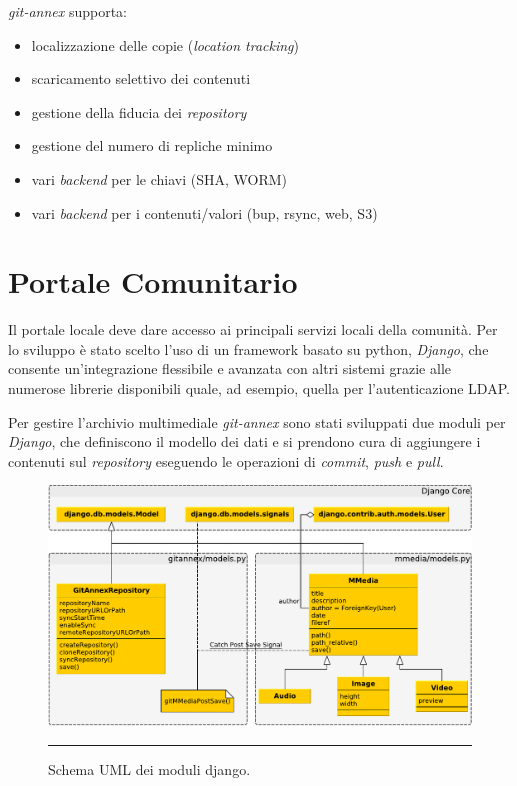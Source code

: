 \emph{git-annex} supporta:
\begin{itemize}
\item localizzazione delle copie (\emph{location tracking})
\item scaricamento selettivo dei contenuti
\item gestione della fiducia dei \emph{repository}
\item gestione del numero di repliche minimo 
\item vari \emph{backend} per le chiavi (SHA, WORM)
\item vari \emph{backend} per i contenuti/valori (bup, rsync, web, S3)
\end{itemize}

\section{Portale Comunitario}

Il portale locale deve dare accesso ai principali servizi locali della
comunità. Per lo sviluppo è stato scelto l'uso di un framework basato
su python, \emph{Django}, che consente un'integrazione flessibile e
avanzata con altri sistemi grazie alle numerose librerie disponibili
quale, ad esempio, quella per l'autenticazione LDAP.

Per gestire l'archivio multimediale \emph{git-annex} sono stati
sviluppati due moduli per \emph{Django}, che definiscono il modello
dei dati e si prendono cura di aggiungere i contenuti sul
\emph{repository} eseguendo le operazioni di \emph{commit},
\emph{push} e \emph{pull}. 

\begin{figure}[htbp]
  \centering
  \includegraphics[width=\textwidth]{./Figure/UML_Schema_Django-crop.pdf}
  \rule{35em}{0.5pt}
  \caption[Schema UML dei moduli django]{Schema UML dei moduli django.}
  \label{fig:SchemaUMLDjango}
\end{figure}

